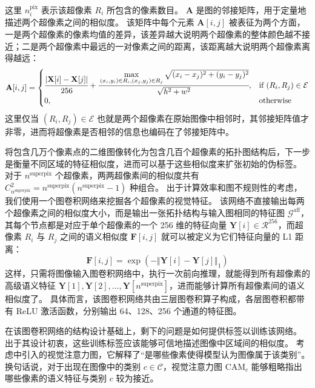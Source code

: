 这里 $n^\text{pix}_i$ 表示该超像素 $R_i$ 所包含的像素数目。
$\mathbf{A}$ 是图的邻接矩阵，用于定量地描述两个超像素之间的相似度。
该矩阵中每个元素 $\mathbf{A}[i,j]$ 被表征为两个方面，一是两个超像素的像素均值的差异，该差异越大说明两个超像素的整体颜色越不接近；二是两个超像素中最远的一对像素之间的距离，该距离越大说明两个超像素离得越远：
\begin{equation}
\mathbf{A}[i,j] =
\begin{cases}
    \cfrac{\vert \mathbf{X}[i] - \mathbf{X}[j] \vert}{256} + \cfrac{\max\limits_{(x_i,y_i) \in R_i,(x_j,y_j) \in R_j}\sqrt{(x_i - x_j)^2 + (y_i - y_j)^2}}{\sqrt{h^2 + w^2}},&\text{if } (R_i, R_j) \in \mathcal{E} \\
    0,&\text{otherwise}
\end{cases}
\end{equation}
这里仅当 $(R_i, R_j) \in \mathcal{E}$ 也就是两个超像素在原始图像中相邻时，其邻接矩阵值才非零，进而将超像素是否相邻的信息也编码在了邻接矩阵中。
\par
将包含几万个像素点的二维图像转化为包含几百个超像素的拓扑图结构后，下一步是衡量不同区域的特征相似度，进而可以基于这些相似度来扩张初始的伪标签。
对于 $n^\text{superpix}$ 个超像素，两两超像素间的相似度共有 $C_{n^\text{superpix}}^2 = n^\text{superpix}(n^\text{superpix}-1)$ 种组合。
出于计算效率和图不规则性的考虑，我们使用一个图卷积网络来挖掘各个超像素的视觉特征。
该网络不直接输出每两个超像素之间的相似度大小，而是输出一张拓扑结构与输入图相同的特征图 $\mathcal{G}^\text{aff}$，其每个节点都是对应于单个超像素的一个 256 维的特征向量 $\mathbf{Y}[i] \in \mathcal{R}^{256}$，而超像素 $R_i$ 与 $R_j$ 之间的语义相似度 $\mathbf{F}[i,j]$ 就可以被定义为它们特征向量的 L1 距离：
\begin{equation}
\mathbf{F}[i,j] = \exp\left(- \Vert \mathbf{Y}[i] - \mathbf{Y}[j] \Vert_1\right)
\label{eqn:gcn-sim}
\end{equation}
这样，只需将图像输入图卷积网络中，执行一次前向推理，就能得到所有超像素的高级语义特征 $\mathbf{Y}[1], \mathbf{Y}[2], \dots, \mathbf{Y}[n^\text{superpix}]$，进而能够计算所有超像素间的语义相似度了。
具体而言，该图卷积网络共由三层图卷积算子构成，各层图卷积都带有 ReLU 激活函数，分别输出 64、128、256 个通道的特征图。
\par
在该图卷积网络的结构设计基础上，剩下的问题是如何提供标签以训练该网络。
出于其设计初衷，这些训练标签应该能够可信地描述图像中区域间的相似度。
考虑中引入的视觉注意力图，它解释了“是哪些像素使得模型认为图像属于该类别”。
换句话说，对于出现在图像中的类别 $c \in \mathcal{C}$，视觉注意力图 $\text{CAM}_c$ 能够粗略指出哪些像素的语义特征与类别 $c$ 较为接近。
